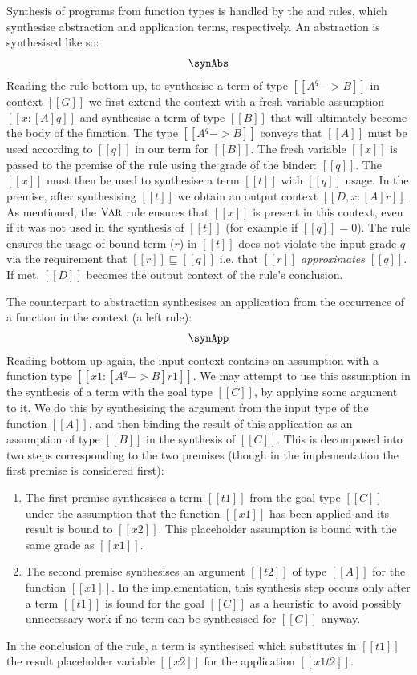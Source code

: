 Synthesis of programs from function types is handled by the \GRANULEdruleAbsName and
\GRANULEdruleAppName rules, which synthesise abstraction and application terms,
respectively. An abstraction is synthesised like so:
\begin{align*}
    \synAbs
\end{align*}
%
Reading the rule bottom up, to synthesise a term of type
$[[ A ^ q -> B ]]$ in context $[[ G ]]$ we first
extend the context
with a fresh variable assumption $[[ x : [A] q ]]$ and synthesise a term of type $[[ B ]]$ that will ultimately become the body
of the function. The type $[[ A ^ q -> B ]]$ conveys that $[[ A ]]$ must be
used according to $[[ q ]]$ in our term for $[[ B ]]$. The fresh variable
$[[ x ]]$  is passed to the premise of the rule using
the grade of the binder: $[[ q ]]$. The $[[ x ]]$ must then be used to synthesise a term
$[[ t ]]$ with $[[ q ]]$ usage. In the premise, after synthesising $[[ t ]]$ we obtain an output context
$[[ D, x : [A] r ]]$. As mentioned, the $\textsc{Var}$ rule ensures
that $[[ x ]]$ is present in this context, even if it was not used in the
synthesis of $[[ t ]]$ (for example if $[[ q ]] = 0$).
The rule ensures the usage of bound term ($r$) in $[[t]]$ does not violate the
input grade $q$ via the requirement that $[[ r ]] \sqsubseteq [[ q ]]$ i.e. that $[[ r ]]$
\textit{approximates} $[[ q ]]$. If met, $[[ D ]]$ becomes the output context of the rule's conclusion.

The counterpart to abstraction synthesises an
application from the occurrence of a function in the context (a left rule):
\begin{align*}
    \synApp
\end{align*}
%
Reading bottom up again, the input context contains an assumption with a function type
$[[ x1 : [A ^ q -> B] r1 ]]$. We may attempt to use this assumption in the synthesis of a
term with the goal type $[[ C ]]$, by applying some argument to it. We do this
by synthesising the argument from the input type of the function $[[ A ]]$, and
then binding the result of this application as an assumption of type $[[ B ]]$ in the
synthesis of $[[ C ]]$. This is decomposed into two steps corresponding to the two
premises (though in the implementation the first premise is considered first):
\begin{enumerate}
        \item The first premise synthesises a term $[[ t1 ]]$ from the goal type
        $[[ C ]]$ under the assumption that the function $[[ x1 ]]$ has been
        applied and its result is bound to
        $[[ x2 ]]$. This placeholder assumption is bound with the same grade as
        $[[ x1 ]]$.
        \item The second premise synthesises an argument $[[ t2 ]]$
        of type $[[ A ]]$ for the function $[[ x1 ]]$.
        In the implementation, this synthesis step occurs only after
        a term $[[ t1 ]]$ is found for the goal $[[ C ]]$ as a heuristic
        to avoid possibly unnecessary work if no term can be synthesised for
        $[[ C ]]$ anyway.
\end{enumerate}
%
In the conclusion of the rule, a term is synthesised
which substitutes in $[[ t1 ]]$ the result placeholder variable $[[ x2 ]]$ for the application
$[[ x1 t2 ]]$.

